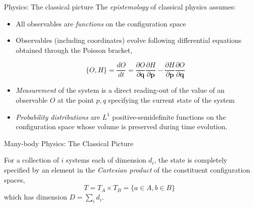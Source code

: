 \documentclass[10pt]{beamer}
\begin{document}
\begin{frame}{Physics: The classical picture}
The \emph{epistemology} of classical physics assumes:
\begin{itemize}
    \item All observables are \emph{functions} on the configuration space %
    \item Observables (including coordinates) evolve following differential equations obtained through the Poisson bracket,
    
    $$ \{O,H\} = \frac{d O}{d t}  = \frac{\partial O}{\partial \textbf{q}}\frac{\partial H}{\partial \textbf{p}}-\frac{\partial H}{\partial \textbf{p}}\frac{\partial O}{\partial \textbf{q}}$$
    
    \item \emph{Measurement} of the system is a direct reading-out of the value of an observable $O$ at the point $p,q$ specifying the current state of the system
    
    \item \emph{Probability distributions} are $L^1$ positive-semidefinite functions on the configuration space whose volume is preserved during time evolution.
\end{itemize}

\end{frame}

\begin{frame}{Many-body Physics: The Classical Picture}

For a collection of $i$ systems each of dimension $d_i$, the state is completely specified by an element in the \emph{Cartesian product} of the constituent configuration spaces, 
$$T = T_A\times T_B =\{a\in A, b\in{B}\}$$
which has dimension $D = \sum_i d_i$. %
\end{frame}
\end{document}

